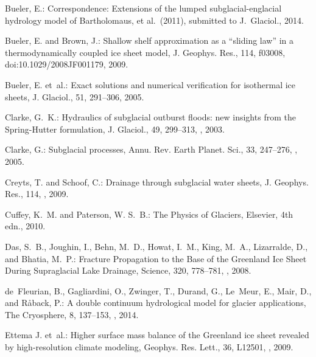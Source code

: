 \documentclass[gmd]{copernicus}   %
\begin{document}
\begin{thebibliography}{}
Bueler, E.: Correspondence: Extensions of the lumped subglacial-englacial
  hydrology model of {B}artholomaus, et al.~(2011), submitted to J.~Glaciol.,
  2014.

Bueler, E. and Brown, J.: Shallow shelf approximation as a ``sliding law'' in a
  thermodynamically coupled ice sheet model, J. Geophys. Res., 114, f03008,
  doi:10.1029/2008JF001179, 2009.

Bueler, E. et~al.: Exact solutions and numerical verification for isothermal ice sheets,
  J. Glaciol., 51, 291--306, 2005.

Clarke, G.~K.: Hydraulics of subglacial outburst floods: new insights from the
  {Spring-Hutter} formulation, J. Glaciol., 49, 299--313,
  , 2003.

Clarke, G.: Subglacial processes, Annu. Rev. Earth Planet. Sci., 33,
  247--276, , 2005.

Creyts, T. and Schoof, C.: Drainage through subglacial water sheets, J.
  Geophys. Res., 114, , 2009.

Cuffey, K.~M. and Paterson, W. S.~B.: The {P}hysics of {G}laciers, Elsevier,
  4th edn., 2010.

Das, S.~B., Joughin, I., Behn, M.~D., Howat, I.~M., King, M.~A., Lizarralde,
  D., and Bhatia, M.~P.: {Fracture Propagation to the Base of the Greenland Ice
  Sheet During Supraglacial Lake Drainage}, Science, 320, 778--781,
  , 2008.

de~Fleurian, B., Gagliardini, O., Zwinger, T., Durand, G., Le~Meur, E., Mair,
  D., and R{\aa}back, P.: A double continuum hydrological model for glacier
  applications, The Cryosphere, 8, 137--153, , 2014.

Ettema J. et~al.: Higher surface mass balance of the Greenland ice sheet
  revealed by high-resolution climate modeling, Geophys. Res. Lett., 36, L12501,
  , 2009.


\end{thebibliography}
\end{document}
